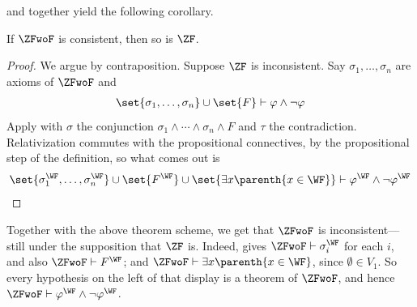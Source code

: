  and  together yield the following corollary.

\begin{boxcorollary} \label{Ch3:Cor:Con_ZF}
    If $\ZFwoF$ is consistent, then so is $\ZF$.
\end{boxcorollary}
\begin{proof}
    We argue by contraposition. Suppose $\ZF$ is inconsistent. Say $\sigma_1, \ldots, \sigma_n$ are axioms of $\ZFwoF$ and
    \begin{align*}
        \set{\sigma_1, \ldots, \sigma_n} \cup \set{F} \vdash \varphi \land \neg\varphi
    \end{align*}
    Apply  with $\sigma$ the conjunction $\sigma_1 \land \cdots \land \sigma_n \land F$ and $\tau$ the contradiction. Relativization commutes with the propositional connectives, by the propositional step of the definition, so what comes out is
    \begin{align*}
        \set{\sigma_1^{\WF}, \ldots, \sigma_n^{\WF}} \cup \set{F^{\WF}} \cup \set{\exists x \parenth{x \in \WF}} \vdash \varphi^{\WF} \land \neg \varphi^{\WF}
    \end{align*}
\end{proof}

Together with the above theorem scheme, we get that $\ZFwoF$ is inconsistent---still under the supposition that $\ZF$ is. Indeed,  gives $\ZFwoF \vdash \sigma_i^{\WF}$ for each $i$, and also $\ZFwoF \vdash F^{\WF}$; and $\ZFwoF \vdash \exists x \parenth{x \in \WF}$, since $\emptyset \in V_1$. So every hypothesis on the left of that display is a theorem of $\ZFwoF$, and hence $\ZFwoF \vdash \varphi^{\WF} \land \neg\varphi^{\WF}$.
